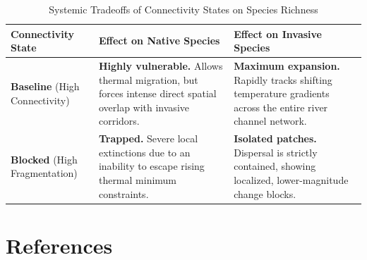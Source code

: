 \documentclass[11pt,a4paper]{article}
\begin{document}
\begin{table}[h!]
\centering
\caption{Systemic Tradeoffs of Connectivity States on Species Richness}
\label{tab:connectivity_tradeoffs}
\vskip 0.1in
\begin{tabular}{p{3.5cm} p{5.5cm} p{5.5cm}}
\toprule
\textbf{Connectivity State} & \textbf{Effect on Native Species} & \textbf{Effect on Invasive Species} \\
\midrule
\textbf{Baseline} \newline (High Connectivity) & \textbf{Highly vulnerable.} Allows thermal migration, but forces intense direct spatial overlap with invasive corridors. & \textbf{Maximum expansion.} Rapidly tracks shifting temperature gradients across the entire river channel network. \\
\addlinespace
\textbf{Blocked} \newline (High Fragmentation) & \textbf{Trapped.} Severe local extinctions due to an inability to escape rising thermal minimum constraints. & \textbf{Isolated patches.} Dispersal is strictly contained, showing localized, lower-magnitude change blocks. \\
\bottomrule
\end{tabular}
\end{table}

\newpage

\clearpage
\section{References}


\end{document}
